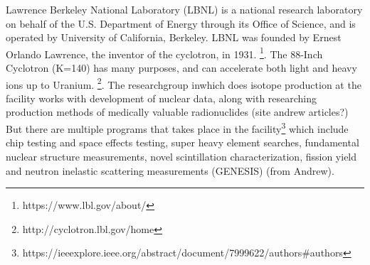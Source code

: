 Lawrence Berkeley National Laboratory (LBNL) is a national research laboratory on behalf of the U.S. Department of Energy through its Office of Science, and is operated by University of California, Berkeley. LBNL was founded by Ernest Orlando Lawrence, the inventor of the cyclotron, in 1931.  \footnote{https://www.lbl.gov/about/}. The 88-Inch Cyclotron (K=140) has many purposes, and can accelerate both light and heavy ions up to Uranium. \footnote{http://cyclotron.lbl.gov/home}. The researchgroup inwhich does isotope production at the facility works with development of nuclear data, along with researching production methods of medically valuable radionuclides (site andrew articles?)   %
But there are multiple programs that takes place in the facility\footnote{https://ieeexplore.ieee.org/abstract/document/7999622/authors#authors} which include chip testing and space effects testing, super heavy element searches, fundamental nuclear structure measurements, novel scintillation characterization, fission yield and neutron inelastic scattering measurements (GENESIS) (from Andrew). \\

